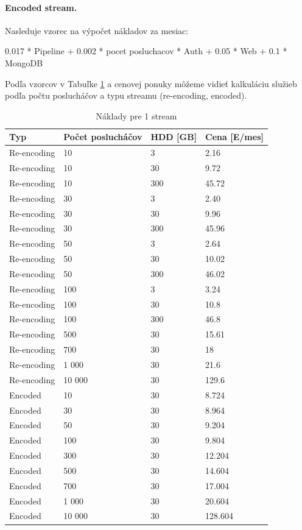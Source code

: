 \documentclass[11pt]{article}
\begin{document}
\paragraph{Encoded stream.} Nasleduje  vzorec na výpočet nákladov za mesiac:

\begin{code}
  0.017 * Pipeline 
+ 0.002 * pocet posluchacov * Auth
+ 0.05  * Web
+ 0.1   * MongoDB
\end{code}

Podľa vzorcov v Tabuľke \ref{compl} a cenovej ponuky môžeme vidieť kalkuláciu služieb podľa počtu poslucháčov a typu streamu (re-encoding, encoded). 

\begin{table}[htp]
\centering
\begin{tabular}{|l|l|l|l|}
\hline 
	Typ & Počet poslucháčov & HDD [GB] & Cena [E/mes]\\
\hline
	Re-encoding & 10    & 3 & 2.16 \\
\hline
	Re-encoding & 10    & 30 & 9.72 \\
\hline
	Re-encoding & 10    & 300 & 45.72 \\
\hline
	Re-encoding & 30    & 3 & 2.40 \\
\hline
	Re-encoding & 30    & 30 & 9.96 \\
\hline
	Re-encoding & 30    & 300 & 45.96 \\
\hline
	Re-encoding & 50    & 3 & 2.64 \\
\hline
	Re-encoding & 50    & 30 & 10.02 \\
\hline
	Re-encoding & 50    & 300 & 46.02 \\
\hline
	Re-encoding & 100    & 3 & 3.24 \\
\hline
	Re-encoding & 100   & 30 & 10.8 \\
\hline
	Re-encoding & 100   & 300 & 46.8 \\
\hline
	Re-encoding & 500   & 30 & 15.61 \\
\hline
	Re-encoding & 700   & 30 & 18 \\
\hline
	Re-encoding & 1 000 & 30 & 21.6 \\
\hline
	Re-encoding & 10 000 & 30 & 129.6 \\
\hline
	Encoded & 10        & 30 & 8.724 \\
\hline
	Encoded & 30        & 30 & 8.964 \\
\hline
	Encoded & 50        & 30 & 9.204 \\
\hline
	Encoded & 100       & 30 & 9.804 \\
\hline 
	Encoded & 300       & 30 & 12.204 \\
\hline
	Encoded & 500       & 30 & 14.604 \\
\hline
	Encoded & 700       & 30 & 17.004 \\
\hline
	Encoded & 1 000     & 30 & 20.604 \\
\hline
	Encoded & 10 000    & 30 & 128.604 \\
\hline
\end{tabular}

\caption{Náklady pre 1 stream}
\label{compl} 
\end{table}
\end{document}
